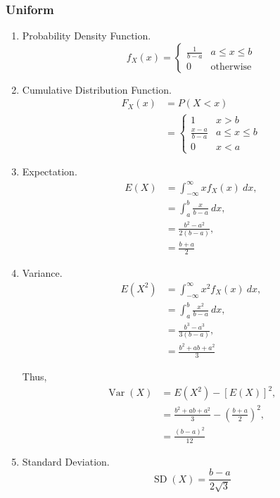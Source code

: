 \documentclass{amsproc}
\DeclareMathOperator{\Var}{\text{Var}}
\DeclareMathOperator{\SD}{\text{SD}}
\begin{document}
			\subsubsection{Uniform}
			\begin{enumerate}
				\item Probability Density Function. \[f_{X}(x) = \begin{cases} \frac{1}{b-a} & a \leq x \leq b \\ 0 & \text{otherwise} \end{cases}\]

				\item Cumulative Distribution Function. 
					\begin{align*}
						F_{X}(x) &= P(X < x)\\
						&= \begin{cases} 1 & x > b \\ \frac{x-a}{b-a} & a \leq x \leq b \\ 0 & x < a   \end{cases}
					\end{align*}

				\item Expectation.
					\begin{align*}
						E(X) &= \int_{-\infty}^{\infty} x f_{X}(x) \ dx, \\
						&= \int_{a}^{b} \frac{x}{b - a} \ dx, \\
						&= \frac{b^{2} - a^{2}}{2(b - a)}, \\
						&= \frac{b + a}{2}
					\end{align*}

				\item Variance.
					\begin{align*}
						E(X^{2}) &= \int_{-\infty}^{\infty} x^{2} f_{X}(x) \ dx, \\
						&= \int_{a}^{b} \frac{x^{2}}{b - a} \ dx, \\
						&= \frac{b^{3} - a^{3}}{3(b - a)}, \\
						&= \frac{b^{2} + ab + a^{2}}{3}
					\end{align*}

					Thus,
					\begin{align*}
						\Var(X) &= E\left( X^{2} \right) - \left[ E\left(X\right) \right]^{2}, \\
						&= \frac{b^{2} + ab + a^{2}}{3} - \left( \frac{b + a}{2} \right)^{2}, \\
						&= \frac{(b - a)^{2}}{12}
					\end{align*}

				\item Standard Deviation. \[\SD(X) = \frac{b - a}{2\sqrt{3}}\]
			\end{enumerate}
\end{document}
